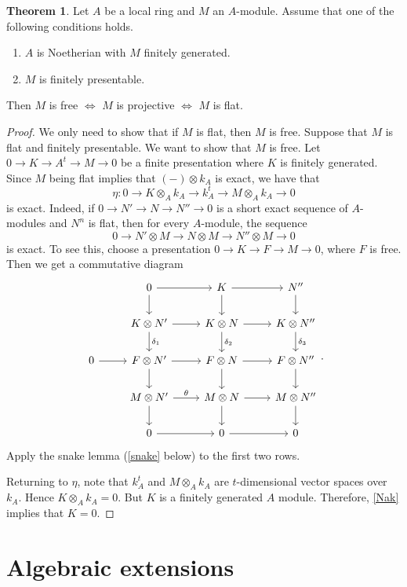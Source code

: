 \documentclass[10pt,letterpaper,cm]{nupset}
\theoremstyle{definition}
\theoremstyle{theorem}
\newtheorem{theorem}[definition]{Theorem}
\theoremstyle{remark}
\newcommand{\1}{\mathbf{1}}
\newcommand{\0}{\vec 0}
\begin{document}
\begin{theorem}
Let $A$ be a local ring and $M$ an $A$-module. Assume that one of the following conditions holds.
\begin{enumerate}[label=(\alph*)]
\item $A$ is Noetherian with $M$ finitely generated.
\item $M$ is finitely presentable.
\end{enumerate}
Then $M$ is free $\iff$ $M$ is projective $\iff$ $M$ is flat.
\end{theorem}
\begin{proof}
We only need to show that if $M$ is flat, then $M$ is free. Suppose that $M$ is flat and finitely presentable. We want to show that $M$ is free. Let $0 \to K \to A^t \to M \to 0$ be a finite presentation  where $K$ is finitely generated. Since $M$ being flat implies that $\left(-\right) \otimes k_A$ is exact, we have that $$\eta : 0 \to K \otimes_A k_A \to k_A^t \to M \otimes_A k_A \to 0$$ is exact. Indeed, if $0 \to N' \to N \to N'' \to 0$ is a short exact sequence of $A$-modules and $N^n$ is flat, then for every $A$-module, the sequence $$0 \to N' \otimes M \to N \otimes M \to N'' \otimes M \to 0$$ is exact. To see this, choose a presentation $0 \to K \to F \to M \to 0$, where $F$ is free. Then we get a commutative diagram
\[
\begin{tikzcd}
 & 0 \arrow[r] \arrow[d] & K \arrow[r] \arrow[d] & N'' \arrow[d] \\
 & K \otimes N' \arrow[r] \arrow[d, "\delta_1"] & K \otimes N \arrow[r] \arrow[d, "\delta_2"] & K \otimes N'' \arrow[d, "\delta_3"] \\
0 \arrow[r] & F \otimes N' \arrow[r] \arrow[d] & F \otimes N \arrow[r] \arrow[d] & F \otimes N'' \arrow[d] \\
 & M \otimes N' \arrow[r, "\theta"] \arrow[d] & M \otimes N \arrow[r] \arrow[d] & M \otimes N'' \arrow[d] \\
 & 0 \arrow[r] & 0 \arrow[r] & 0
\end{tikzcd}
.\]  Apply the snake lemma (\cref{snake} below) to the first two rows.  

Returning to $\eta$, note that $k_A^t$ and $M \otimes_A k_A$ are $t$-dimensional vector spaces over $k_A$. Hence $K \otimes_A k_A = 0$. But $K$ is a finitely generated $A$ module. Therefore, \cref{Nak} implies  that $K = 0$. 
\end{proof}

\section{Algebraic extensions}
\end{document}
